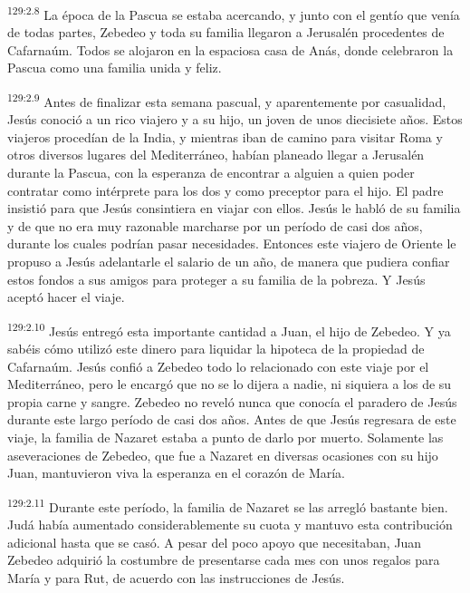 \par
\textsuperscript{129:2.8} La época de la Pascua se estaba acercando, y junto con el gentío que venía de todas partes, Zebedeo y toda su familia llegaron a Jerusalén procedentes de Cafarnaúm. Todos se alojaron en la espaciosa casa de Anás, donde celebraron la Pascua como una familia unida y feliz.

\par
\textsuperscript{129:2.9} Antes de finalizar esta semana pascual, y aparentemente por casualidad, Jesús conoció a un rico viajero y a su hijo, un joven de unos diecisiete años. Estos viajeros procedían de la India, y mientras iban de camino para visitar Roma y otros diversos lugares del Mediterráneo, habían planeado llegar a Jerusalén durante la Pascua, con la esperanza de encontrar a alguien a quien poder contratar como intérprete para los dos y como preceptor para el hijo. El padre insistió para que Jesús consintiera en viajar con ellos. Jesús le habló de su familia y de que no era muy razonable marcharse por un período de casi dos años, durante los cuales podrían pasar necesidades. Entonces este viajero de Oriente le propuso a Jesús adelantarle el salario de un año, de manera que pudiera confiar estos fondos a sus amigos para proteger a su familia de la pobreza. Y Jesús aceptó hacer el viaje.

\par
\textsuperscript{129:2.10} Jesús entregó esta importante cantidad a Juan, el hijo de Zebedeo. Y ya sabéis cómo utilizó este dinero para liquidar la hipoteca de la propiedad de Cafarnaúm. Jesús confió a Zebedeo todo lo relacionado con este viaje por el Mediterráneo, pero le encargó que no se lo dijera a nadie, ni siquiera a los de su propia carne y sangre. Zebedeo no reveló nunca que conocía el paradero de Jesús durante este largo período de casi dos años. Antes de que Jesús regresara de este viaje, la familia de Nazaret estaba a punto de darlo por muerto. Solamente las aseveraciones de Zebedeo, que fue a Nazaret en diversas ocasiones con su hijo Juan, mantuvieron viva la esperanza en el corazón de María.

\par
\textsuperscript{129:2.11} Durante este período, la familia de Nazaret se las arregló bastante bien. Judá había aumentado considerablemente su cuota y mantuvo esta contribución adicional hasta que se casó. A pesar del poco apoyo que necesitaban, Juan Zebedeo adquirió la costumbre de presentarse cada mes con unos regalos para María y para Rut, de acuerdo con las instrucciones de Jesús.

